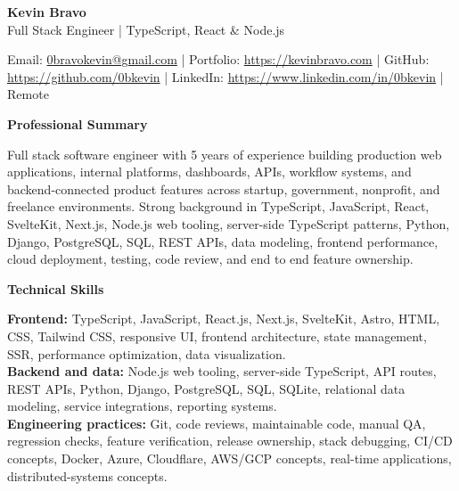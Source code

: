 \documentclass[10pt]{article}
\begin{document}
\raggedright

\begin{center}
    {\LARGE \textbf{Kevin Bravo}}\\
    Full Stack Engineer | TypeScript, React \& Node.js \\
    \hrulefill
\end{center}

\begin{center}
    Email: \href{mailto:0bravokevin@gmail.com}{0bravokevin@gmail.com}
    | Portfolio: \href{https://kevinbravo.com}{https://kevinbravo.com}
    | GitHub: \href{https://github.com/0bkevin}{https://github.com/0bkevin}
    | LinkedIn: \href{https://www.linkedin.com/in/0bkevin/}{https://www.linkedin.com/in/0bkevin}
    | Remote
\end{center}

\vspace{2pt}
\begin{center}
    \textbf{Professional Summary}
\end{center}
\vspace{-6pt}
Full stack software engineer with 5 years of experience building production web applications, internal platforms, dashboards, APIs, workflow systems, and backend-connected product features across startup, government, nonprofit, and freelance environments. Strong background in TypeScript, JavaScript, React, SvelteKit, Next.js, Node.js web tooling, server-side TypeScript patterns, Python, Django, PostgreSQL, SQL, REST APIs, data modeling, frontend performance, cloud deployment, testing, code review, and end to end feature ownership.

\vspace{4pt}
\begin{center}
    \textbf{Technical Skills}
\end{center}
\vspace{-6pt}
\textbf{Frontend:} TypeScript, JavaScript, React.js, Next.js, SvelteKit, Astro, HTML, CSS, Tailwind CSS, responsive UI, frontend architecture, state management, SSR, performance optimization, data visualization. \\
\textbf{Backend and data:} Node.js web tooling, server-side TypeScript, API routes, REST APIs, Python, Django, PostgreSQL, SQL, SQLite, relational data modeling, service integrations, reporting systems. \\
\textbf{Engineering practices:} Git, code reviews, maintainable code, manual QA, regression checks, feature verification, release ownership, stack debugging, CI/CD concepts, Docker, Azure, Cloudflare, AWS/GCP concepts, real-time applications, distributed-systems concepts.
\end{document}
